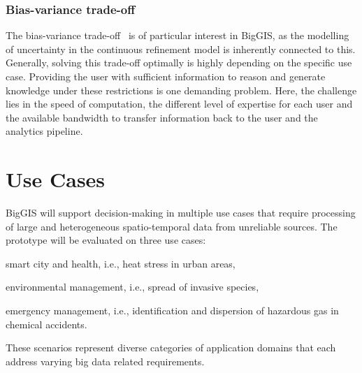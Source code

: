 \documentclass{sig-alternate-05-2015}
\begin{document}
\subsubsection{Bias-variance trade-off}
The bias-variance trade-off~\cite{Hastie2009} is of particular
interest in BigGIS, as the modelling of uncertainty in the continuous
refinement model is inherently connected to this. Generally, solving this
trade-off optimally is highly depending on the specific use case. Providing the
user with sufficient information to reason and generate knowledge under these
restrictions is one demanding problem. Here, the challenge lies in the speed of
computation, the different level of expertise for each user and the available
bandwidth to transfer information back to the user and the analytics pipeline.

\section{Use Cases}
\label{sec:use}
BigGIS will support decision-making in multiple use cases that require
processing of large and heterogeneous spatio-temporal data from unreliable
sources. The prototype will be evaluated on three use cases: 
\begin{inparaenum}[(1)]
	\item smart city and health, i.e., heat stress in urban areas,
	\item environmental management, i.e., spread of invasive species,
	\item emergency management, i.e., identification and dispersion of hazardous
gas in chemical accidents.
\end{inparaenum}
These scenarios represent diverse categories of application domains that each 
address varying big data related requirements. 
\end{document}
